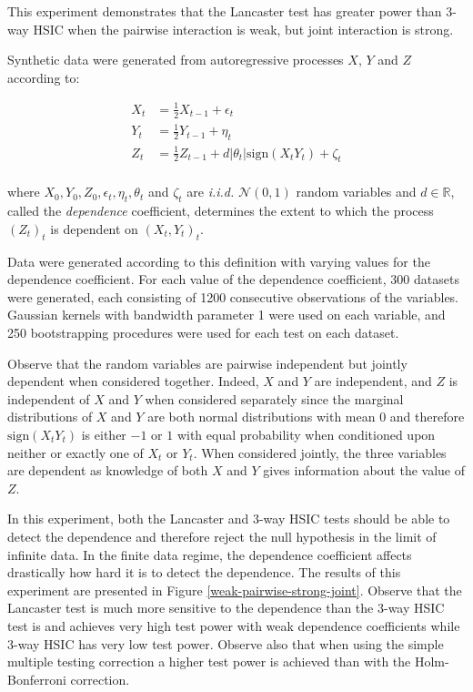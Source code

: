 \documentclass[]{article}
\begin{document}
This experiment demonstrates that the Lancaster test has greater power than 3-way HSIC when the pairwise interaction is weak, but joint interaction is strong.


Synthetic data were generated from autoregressive processes $X$, $Y$ and $Z$ according to:

\begin{align*}
X_t &= \frac{1}{2}X_{t-1} + \epsilon_t\\
Y_t &= \frac{1}{2}Y_{t-1} + \eta_t\\
Z_t &= \frac{1}{2}Z_{t-1} + d |\theta_t|\text{sign}(X_t Y_t) + \zeta_t\\
\end{align*}

where $X_0, Y_0, Z_0, \epsilon_t, \eta_t, \theta_t$ and $\zeta_t$ are \emph{i.i.d. } $\mathcal{N}(0,1)$ random variables and $d\in\mathbb{R}$, called the \emph{dependence} coefficient, determines the extent to which the process $(Z_t)_t$ is dependent on $(X_t,Y_t)_t$.

Data were generated according to this definition with varying values for the dependence coefficient. For each value of the dependence coefficient, 300 datasets were generated, each consisting of 1200 consecutive observations of the variables. Gaussian kernels with bandwidth parameter 1 were used on each variable, and 250 bootstrapping procedures were used for each test on each dataset.

Observe that the random variables are pairwise independent but jointly dependent when considered together. Indeed, $X$ and $Y$ are independent, and $Z$ is independent of $X$ and $Y$ when considered separately since the marginal distributions of $X$ and $Y$ are both normal distributions with mean 0 and therefore $\text{sign}(X_t Y_t)$ is either $-1$ or $1$ with equal probability when conditioned upon neither or exactly one of $X_t$ or $Y_t$. When considered jointly, the three variables are dependent as knowledge of both $X$ and $Y$ gives information about the value of $Z$.

In this experiment, both the Lancaster and 3-way HSIC tests should be able to detect the dependence and therefore reject the null hypothesis in the limit of infinite data. In the finite data regime, the dependence coefficient affects drastically how hard it is to detect the dependence. The results of this experiment are presented in Figure \ref{weak-pairwise-strong-joint}. Observe that the Lancaster test is much more sensitive to the dependence than the 3-way HSIC test is and achieves very high test power with weak dependence coefficients while 3-way HSIC has very low test power. Observe also that when using the simple multiple testing correction a higher test power is achieved than with the Holm-Bonferroni correction.
\end{document}
